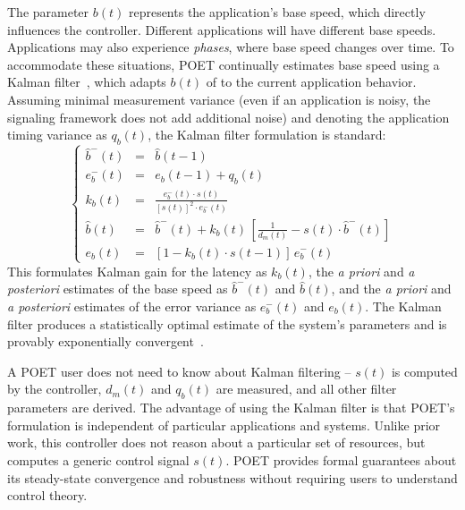 The parameter $b(t)$ represents the application's base speed, which directly influences the controller.
Different applications will have different base speeds.
Applications may also experience \emph{phases}, where base speed changes over time.
To accommodate these situations, POET continually estimates base speed using a Kalman filter~\cite{welch2006kalman}, which adapts $b(t)$ of  to the current application behavior.
Assuming minimal measurement variance (\ie even if an application is noisy, the signaling framework does not add additional noise) and denoting the application timing variance as $q_b(t)$, the Kalman filter formulation is standard:
\begin{equation}
\left \lbrace
\begin{array}{rcl}
\hat{b}^{-}(t) & = & \hat{b}(t-1) \\
e^{-}_{b}(t) & = & e_{b}(t-1) + q_b(t) \\
k_b(t) 
  & = & \frac{e^{-}_{b}(t) \cdot s(t)}{[s(t)]^2
        \cdot e^{-}_{b}(t)} \\
\hat{b}(t) 
  & = & \hat{b}^{-}(t) + k_b(t) 
        \, \left[ \frac{1}{d_m(t)} - s(t) \cdot \hat{b}^{-}(t) \right] \\
e_{b}(t) & = & [1 - k_b(t) \cdot s(t-1)] \, e^{-}_{b}(t)
\end{array}
\right .
\label{eqn:kalman-filter}
\end{equation}
This formulates Kalman gain for the latency as $k_b(t)$, the \emph{a priori} and \emph{a posteriori} estimates of the base speed as $\hat{b}^{-}(t)$ and $\hat{b}(t)$, and the \emph{a priori} and \emph{a posteriori} estimates of the error variance as $e^{-}_{b}(t)$ and $e_{b}(t)$.
The Kalman filter produces a statistically optimal estimate of the system's parameters and is provably exponentially convergent~\cite{CaoSchwartz2003}.

A POET user does not need to know about Kalman filtering -- $s(t)$ is computed by the controller, $d_m(t)$ and $q_b(t)$ are measured, and all other filter parameters are derived.
The advantage of using the Kalman filter is that POET's formulation is independent of particular applications and systems.
Unlike prior work, this controller does not reason about a particular set of resources, but computes a generic control signal $s(t)$.
POET provides formal guarantees about its steady-state convergence and robustness without requiring users to understand control theory.


